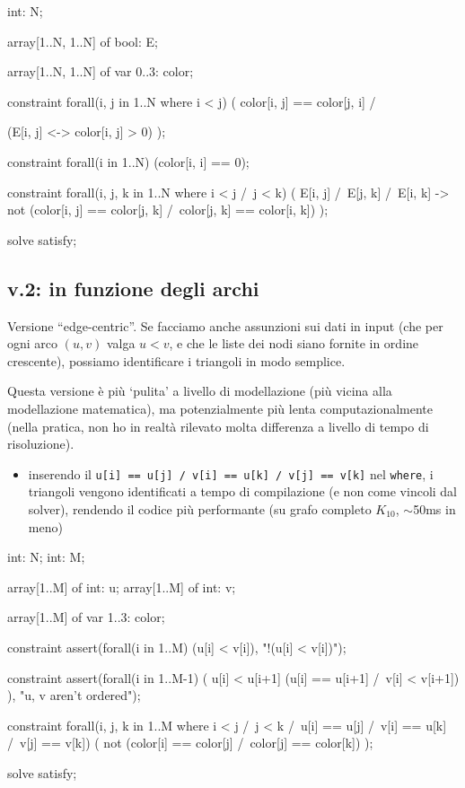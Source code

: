\documentclass[12pt]{article}
\begin{document}
\begin{mznbox}{}
int: N; 

array[1..N, 1..N] of bool: E;

array[1..N, 1..N] of var 0..3: color;

constraint forall(i, j in 1..N where i < j) (
    color[i, j] == color[j, i] /\ 

    (E[i, j] <-> color[i, j] > 0)
);

constraint forall(i in 1..N) (color[i, i] == 0);

constraint forall(i, j, k in 1..N where i < j /\ j < k) (
    E[i, j] /\ E[j, k] /\ E[i, k] ->
        not (color[i, j] == color[j, k] /\ color[j, k] == color[i, k])
);

solve satisfy;  
\end{mznbox}


\subsection{v.2: in funzione degli archi}
Versione ``edge-centric''. Se facciamo anche assunzioni sui dati in input (che per ogni arco $(u, v)$ valga $u < v$, e che le liste dei nodi siano fornite in ordine crescente), possiamo identificare i triangoli in modo semplice.

Questa versione è più `pulita' a livello di modellazione (più vicina alla modellazione matematica), ma potenzialmente più lenta computazionalmente (nella pratica, non ho in realtà rilevato molta differenza a livello di tempo di risoluzione).

\begin{itemize}
    \item inserendo il \texttt{u[i] == u[j] /\ v[i] == u[k] /\ v[j] == v[k]} nel \texttt{where}, i triangoli vengono identificati a tempo di compilazione (e non come vincoli dal solver), rendendo il codice più performante (su grafo completo $K_{10}$, $\sim$50ms in meno)
\end{itemize}

\begin{mznbox}{}
int: N; %
int: M; %

array[1..M] of int: u;
array[1..M] of int: v;

array[1..M] of var 1..3: color;

constraint assert(forall(i in 1..M) (u[i] < v[i]), 
    "!(u[i] < v[i])");

constraint assert(forall(i in 1..M-1) (
    u[i] < u[i+1] \/ (u[i] == u[i+1] /\ v[i] < v[i+1])
), "u, v aren't ordered");

constraint forall(i, j, k in 1..M where i < j /\ j < k /\ u[i] == u[j] /\ v[i] == u[k] /\ v[j] == v[k]) 
(
    not (color[i] == color[j] /\ color[j] == color[k])
);

solve satisfy;

\end{mznbox}
\end{document}
